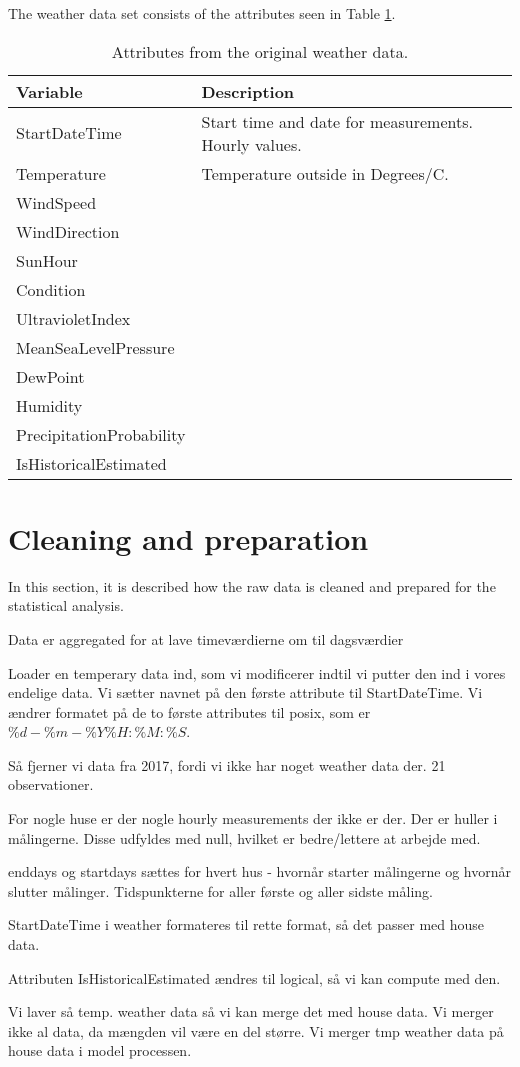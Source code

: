 The weather data set consists of the attributes seen in Table \ref{tab: weatherdata}.
\begin{table}[H]
    \centering
    \begin{tabular}{ll}
     \hline
     \textbf{Variable} & \textbf{Description} \\
    \hline
    \hline
    StartDateTime  &  Start time and date for measurements. Hourly values.\\
    Temperature  &  Temperature outside in Degrees/C. \\
    WindSpeed  &  \\
    WindDirection  &  \\
    SunHour  &  \\
    Condition  & \\
    UltravioletIndex  &   \\
    MeanSeaLevelPressure  & \\
    DewPoint  &  \\
    Humidity  &  \\
    PrecipitationProbability & \\
    IsHistoricalEstimated & \\
    \hline
    \end{tabular}
    \caption{Attributes from the original weather data.}
    \label{tab: weatherdata}
\end{table}   


\section{Cleaning and preparation}
In this section, it is described how the raw data is cleaned and prepared for the statistical analysis. 

Data er aggregated for at lave timeværdierne om til dagsværdier

Loader en temperary data ind, som vi modificerer indtil vi putter den ind i vores endelige data. 
Vi sætter navnet på den første attribute til StartDateTime. Vi ændrer formatet på de to første attributes til posix, som er $\%d-\%m-\%Y \%H:\%M:\%S$.

Så fjerner vi data fra 2017, fordi vi ikke har noget weather data der. 21 observationer. 

For nogle huse er der nogle hourly measurements der ikke er der. Der er huller i målingerne. Disse udfyldes med null, hvilket er bedre/lettere at arbejde med. 

enddays og startdays sættes for hvert hus - hvornår starter målingerne og hvornår slutter målinger. Tidspunkterne for aller første og aller sidste måling. 

StartDateTime i weather formateres til rette format, så det passer med house data. 

Attributen IsHistoricalEstimated ændres til logical, så vi kan compute med den. 

Vi laver så temp. weather data så vi kan merge det med house data. 
Vi merger ikke al data, da mængden vil være en del større. Vi merger tmp weather data på house data i model processen. 


